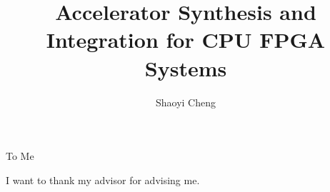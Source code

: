 \documentclass{ucbthesis}
\begin{document}

\title{Accelerator Synthesis and Integration for CPU FPGA Systems }
\author{Shaoyi Cheng}



\maketitle

\approvalpage

\copyrightpage



\begin{frontmatter}

\begin{dedication}
\null\vfil
\begin{center}
To Me\\\vspace{12pt}
\end{center}
\vfil\null
\end{dedication}

\tableofcontents
\clearpage
\listoffigures
\clearpage
\listoftables
\clearpage


\begin{acknowledgements}
I want to thank my advisor for advising me.
\end{acknowledgements}

\end{frontmatter}

\pagestyle{headings}











\printbibliography
\end{document}
